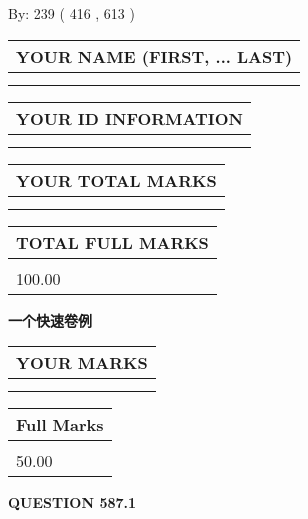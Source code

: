 \documentclass{ctexart}
\begin{document}
   
\hspace{1.0in} By: 
 239 ( 416 ,  613 )
   
   
   
   
\newpage 
\setcounter{page}{ 
   587001 } 
   
   
   
   
\noindent\begin{tabular}{|l|}
\hline
YOUR NAME (FIRST, ... LAST)  \\
\hline
 \\ 
 \\ 
\hline
\end{tabular}
\hspace{0.05in} \begin{tabular}{|l|}
\hline
 YOUR   ID   INFORMATION  \\
\hline
 \\ 
 \\ 
\hline
\end{tabular}
   
   
\vspace{0.2in}\noindent\begin{tabular}{|l|}
\hline
YOUR TOTAL MARKS  \\
\hline
 \\ 
 \\ 
\hline
\end{tabular}
\hspace{0.05in} \begin{tabular}{|l|}
\hline
TOTAL FULL MARKS  \\
\hline
 \\ 
100.00 \\
\hline
\end{tabular}
   
   
 \vspace{0.2in}
{\LARGE {\textbf{ 一个快速卷例}}}
   
   
  
\vspace{0.2in}
  
\noindent\begin{tabular}{|l|}
\hline
 YOUR MARKS  \\
\hline
 \\ 
 \\ 
\hline
\end{tabular}
\hspace{0.05in} \begin{tabular}{|l|}
\hline
 Full Marks  \\
\hline
 \\ 
50.00 \\
\hline
\end{tabular}
{\textbf{\Large{QUESTION
587.1 
}}}
  
\end{document}
